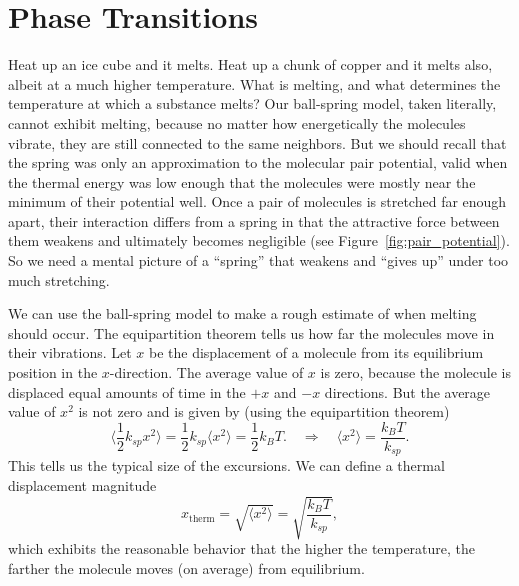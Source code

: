 \section{Phase Transitions}
\label{sec:phase_transitions}

Heat up an ice cube and it melts.  Heat up a chunk of copper and it
melts also, albeit at a much higher temperature.  What is melting, and
what determines the temperature at which a substance melts?  Our
ball-spring model, taken literally, cannot exhibit melting, because no
matter how energetically the molecules vibrate, they are still
connected to the same neighbors.  But we should recall that the spring
was only an approximation to the molecular pair potential, valid when
the thermal energy was low enough that the molecules were mostly near
the minimum of their potential well.  Once a pair of molecules is
stretched far enough apart, their interaction differs from a spring in
that the attractive force between them weakens and ultimately becomes
negligible (see Figure~\ref{fig:pair_potential}).  So we need a mental
picture of a ``spring'' that weakens and ``gives up'' under too much
stretching.

We can use the ball-spring model to make a rough estimate of when
melting should occur.  The equipartition theorem tells us how far the
molecules move in their vibrations.  Let $x$ be the displacement
of a molecule from its equilibrium position in the $x$-direction.  The
average value of $x$ is zero, because the molecule is displaced equal
amounts of time in the $+x$ and $-x$ directions.  But the
average value of $x^2$ is not zero and is given by (using the
equipartition theorem)
\begin{equation}
\bigl\langle{\textstyle\frac{1}{2}}k_{sp}{x^2}\bigr\rangle =
{\textstyle\frac{1}{2}}k_{sp}\langle{x^2}\rangle 
= {\textstyle\frac{1}{2}}k_BT.
\quad\Rightarrow\quad
\langle x^2\rangle = \frac{k_BT}{k_{sp}}.
\end{equation}
This tells us the typical size of the excursions.  We can define a
thermal displacement magnitude
\begin{equation}
x_\text{therm} = \sqrt{\langle x^2\rangle} = \sqrt{\frac{k_BT}{k_{sp}}},
\label{eq:x_thermal}
\end{equation}
which exhibits the reasonable behavior that the higher the temperature,
the farther the molecule moves (on average) from equilibrium.  

